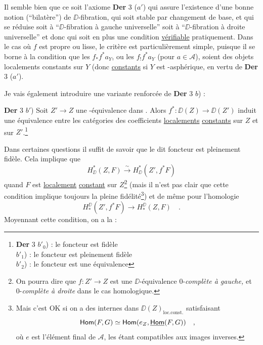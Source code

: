 Il semble bien que ce soit l’axiome \textbf{Der} 3 ($a'$) qui assure l’existence d’une bonne notion (“bilatère”) de $\DD$-fibration, qui soit stable par changement de base, et qui se réduise soit
à “$\DD$-fibration à gauche universelle” soit à “$\DD$-fibration à droite universelle” et donc qui soit en plus une condition \underline{vérifiable} pratiquement. Dans le cas où $f$ est propre ou lisse, le critère est particulièrement simple, puisque il se borne à la condition que les $f_* f^* a_Y$, ou les $f_! f^* a_Y$ (pour $a \in \mathcal{A}$), soient des objets localements constants sur $Y$ (donc \underline{constants} si $Y$ est \underline{\underline{\Hot}}-asphérique, en vertu de \textbf{Der} 3 ($a'$). %

Je vais également introduire une variante renforcée de \textbf{Der} 3 $b$) :

\textbf{Der} 3 $b'$) Soit $Z' \to Z$ une \Hot-équivalence dans \Dia. Alors $f^* : \DD(Z) \to \DD(Z')$ induit une équivalence entre les catégories des coefficients \underline{localements} \underline{constants} sur $Z$ et sur $Z'$.\footnote[50]{\textbf{Der} 3 $b'_0$) : le foncteur est fidèle\\
\hspace*{6em}$b'_1$) : le foncteur est pleinement fidèle\\
\hspace*{6em}$b'_2$) : le foncteur est une équivalence} %

Dans certaines questions il suffit de savoir que le dit foncteur est pleinement fidèle. Cela implique que
\[
H^*_{\DD}(Z,F) \overset{\sim}{\longrightarrow} H^*_{\DD}(Z', f^*F)
\]
quand $F$ est \underline{localement} \underline{constant} sur $Z$\footnote[51]{On pourra dire que $f : Z' \to Z$ est une $\DD$-équivalence 0-\textit{complète à gauche,} et 0-\textit{complète à droite} dans le cas homologique.} (mais il n’est pas clair que cette condition implique toujours la pleine fidélité\footnote[52]{Mais c’est OK si on a des \underline{\Hom} internes dans $\DD(Z)_{\mathrm{loc.const.}}$ satisfaisant
\[
\mathsf{Hom}(F,G) \simeq \mathsf{Hom}(e_Z, \underline{\mathsf{Hom}}(F,G)) \quad ,
\]
où $e$ est l’élément final de $\mathcal{A}$, les \underline{\Hom} étant compatibles aux images inverses.}) et de même pour l’homologie
\[
H_*^{\DD}(Z', f^*F) \longrightarrow H_*^{\DD}(Z,F) \quad .
\]
Moyennant cette condition, on a la :

